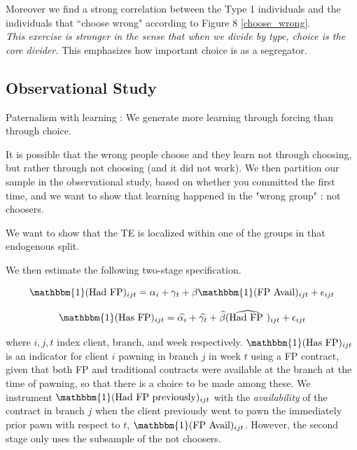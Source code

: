 \documentclass[oneside,11pt]{article}
\begin{document}
Moreover we find a strong correlation between the Type 1 individuals and the individuals that ``choose wrong" according to Figure 8 \ref{choose_wrong}.\\

\emph{This exercise is stronger in the sense that when we divide by type, choice is the core divider.} This emphasizes how important choice is as a segregator.


\subsection{Observational Study}

Paternalism  with learning : We generate more learning through forcing than through choice.

It is possible that the wrong people choose and they learn not through choosing, but rather through not choosing (and it did not work). We then partition our sample in the observational study, based on whether you committed the first time, and we want to show that learning happened in the "wrong group" : not choosers.

We want to show that the TE is localized within one of the groups in that endogenous split. 

We then estimate the following two-stage specification.


\begin{equation}
    \mathbbm{1}(\text{Had FP})_{ijt} = \alpha_i + \gamma_t + \beta \mathbbm{1}(\text{FP Avail})_{ijt}  + \epsilon_{ijt}
    \label{eqn:fs}
\end{equation}


\begin{equation}
    \mathbbm{1}(\text{Has FP})_{ijt} = \widehat{\alpha_i }+ \widehat{\gamma_t} + \widehat{\beta }(\widehat{\text{Had FP }})_{ijt}  + \epsilon_{ijt}
    \label{eqn:2s}
\end{equation}



where $i,j,t$ index client, branch, and week respectively. $\mathbbm{1}(\text{Has FP})_{ijt}$ is an indicator for client $i$ pawning in branch $j$ in week $t$ using a FP contract, given that both FP and traditional contracts were available at the branch at the time of pawning, so that there is a choice to be made among these. We instrument $\mathbbm{1}(\text{Had FP previously})_{ijt}$ with the \textit{availability} of the contract in branch $j$  when the client previously went to pawn the immediately prior pawn with respect to $t$, $\mathbbm{1}(\text{FP Avail})_{ijt}$. However, the second stage only uses the subsample of the not choosers. 
\end{document}
